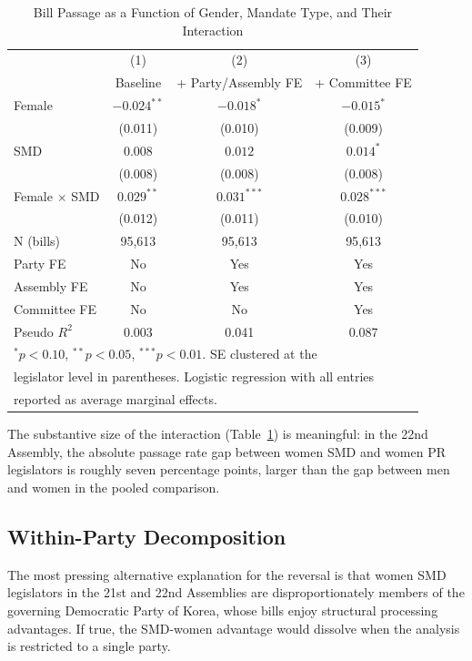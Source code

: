 \documentclass[11pt]{article}
\begin{document}
\begin{table}[H]
\centering
\caption{Bill Passage as a Function of Gender, Mandate Type, and Their Interaction}
\label{tab:main}
\begin{tabular}{lccc}
\toprule
 & (1) & (2) & (3) \\
 & Baseline & + Party/Assembly FE & + Committee FE \\
\midrule
Female & $-0.024^{**}$ & $-0.018^{*}$ & $-0.015^{*}$ \\
 & (0.011) & (0.010) & (0.009) \\
SMD & $0.008$ & $0.012$ & $0.014^{*}$ \\
 & (0.008) & (0.008) & (0.008) \\
Female $\times$ SMD & $0.029^{**}$ & $0.031^{***}$ & $0.028^{***}$ \\
 & (0.012) & (0.011) & (0.010) \\
\midrule
N (bills) & 95{,}613 & 95{,}613 & 95{,}613 \\
Party FE & No & Yes & Yes \\
Assembly FE & No & Yes & Yes \\
Committee FE & No & No & Yes \\
Pseudo $R^2$ & 0.003 & 0.041 & 0.087 \\
\bottomrule
\multicolumn{4}{l}{\footnotesize $^*p<0.10$, $^{**}p<0.05$, $^{***}p<0.01$. SE clustered at the} \\
\multicolumn{4}{l}{\footnotesize legislator level in parentheses. Logistic regression with all entries} \\
\multicolumn{4}{l}{\footnotesize reported as average marginal effects.} \\
\end{tabular}
\end{table}

The substantive size of the interaction (Table~\ref{tab:main}) is meaningful: in the 22nd Assembly, the absolute passage rate gap between women SMD and women PR legislators is roughly seven percentage points, larger than the gap between men and women in the pooled comparison.

\subsection{Within-Party Decomposition}

The most pressing alternative explanation for the reversal is that women SMD legislators in the 21st and 22nd Assemblies are disproportionately members of the governing Democratic Party of Korea, whose bills enjoy structural processing advantages. If true, the SMD-women advantage would dissolve when the analysis is restricted to a single party.
\end{document}
